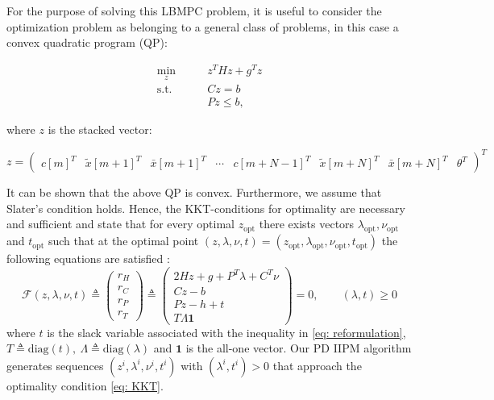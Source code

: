\documentclass[letter]{article}
\begin{document}
\begin{sffamily}
\noindent
For the purpose of solving this LBMPC problem, it is useful to consider the optimization problem as belonging to a general class of problems, in this case a convex quadratic program (QP):

\begin{align}\label{eq: reformulation}
	 \min_{z} \qquad & z^T H z + g^T z  \\
	  \text{s.t.} \qquad & C z = b \nonumber \\
	 & P z \leq b, \nonumber 
\end{align}

\noindent
where $z$ is the stacked vector:

\begin{equation*}
	z = \begin{pmatrix}	
		c[m]^T & \tilde{x}[m+1]^T & \bar{x}[m+1]^T & \cdots & c[m+N-1]^T & \tilde{x}[m+N]^T & \bar{x}[m+N]^T & \theta^T	\end{pmatrix}^T
\end{equation*}

\noindent
It can be shown that the above QP is convex. Furthermore, we assume that Slater's condition \citep[Ch. 2]{Borrelli2011Book} holds. Hence, the KKT-conditions for optimality are necessary and sufficient and state that for every optimal $z_\text{opt}$ there exists vectors $\lambda_\text{opt}, \nu_\text{opt}$ and $t_\text{opt}$ such that at the optimal point $(z,\lambda,\nu,t)=(z_\text{opt},\lambda_\text{opt},\nu_\text{opt},t_\text{opt})$ the following equations are satisfied \citep{Nocedal2000NumOpt}:
\begin{equation}
\label{eq: KKT}
	\mathcal{F}(z,\lambda,\nu,t) \triangleq 
	\begin{pmatrix}
		r_H \\ r_C \\ r_P \\ r_T
	\end{pmatrix} \triangleq
	\begin{pmatrix}
		2Hz + g + P^T \lambda + C^T \nu \\
		Cz - b \\
		Pz-h+t \\
		T\Lambda\mathbf{1}
	\end{pmatrix} = 0,\qquad (\lambda, t) \geq 0
\end{equation}
where $t$ is the slack variable associated with the inequality in \eqref{eq: reformulation}, $T\triangleq\text{diag}(t),\ \Lambda\triangleq\text{diag}(\lambda)$ and $\mathbf{1}$ is the all-one vector. Our PD IIPM algorithm generates sequences $(z^i,\lambda^i,\nu^i,t^i)$ with $(\lambda^i,t^i)>0$ that approach the optimality condition \eqref{eq: KKT}. \\


\end{sffamily}
\end{document}
